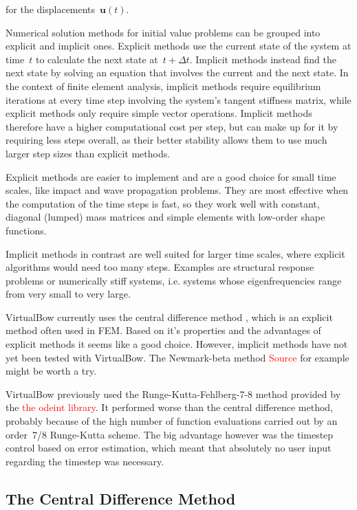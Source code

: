 for the displacements~$\boldsymbol{u}(t)$.

Numerical solution methods for initial value problems can be grouped into explicit and implicit ones.
Explicit methods use the current state of the system at time~$t$ to calculate the next state at~$t + \Delta t$.
Implicit methods instead find the next state by solving an equation that involves the current and the next state.
In the context of finite element analysis, implicit methods require equilibrium iterations at every time step involving the system's tangent stiffness matrix, while explicit methods only require simple vector operations.
Implicit methods therefore have a higher computational cost per step, but can make up for it by requiring less steps overall, as their better stability allows them to use much larger step sizes than explicit methods.

Explicit methods are easier to implement and are a good choice for small time scales, like impact and wave propagation problems.
They are most effective when the computation of the time steps is fast, so they work well with constant, diagonal (lumped) mass matrices and simple elements with low-order shape functions.

Implicit methods in contrast are well suited for larger time scales, where explicit algorithms would need too many steps.
Examples are structural response problems or numerically stiff systems, i.e. systems whose eigenfrequencies range from very small to very large.

VirtualBow currently uses the central difference method \cite{bib:dynamic_solution}, which is an explicit method often used in FEM.
Based on it's properties and the advantages of explicit methods it seems like a good choice.
However, implicit methods have not yet been tested with VirtualBow. The Newmark-beta method \textcolor{red}{Source} for example might be worth a try.

VirtualBow previously used the Runge-Kutta-Fehlberg-7-8 method provided by the \textcolor{red}{the odeint library}.
It performed worse than the central difference method, probably because of the high number of function evaluations carried out by an order~7/8 Runge-Kutta scheme.
The big advantage however was the timestep control based on error estimation, which meant that absolutely no user input regarding the timestep was necessary.

\subsection{The Central Difference Method}

